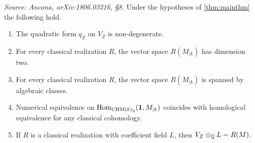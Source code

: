 \begin{proposition}
  \label{prop:mainthm-properties}
  \textit{Source: Ancona, arXiv:1806.03216, §8.}
  Under the hypotheses of \cref{thm:mainthm} the following hold.
  \begin{enumerate}
    \item The quadratic form \(q_Z\) on \(V_Z\) is non-degenerate.
    \item For every classical realization \(R\), the vector space
      \(R(M_{\vert{k}})\) has dimension two.
    \item For every classical realization \(R\), the vector space
      \(R(M_{\vert{k}})\) is spanned by algebraic classes.
    \item Numerical equivalence on \(\mathrm{Hom}_{\mathrm{CHM}(k)_{\mathbb{Q}}}(\mathbf{1}, M_{\vert{k}})\)
      coincides with homological equivalence for any classical cohomology.
    \item If \(R\) is a classical realization with coefficient field \(L\), then
      \(V_Z \otimes_{\mathbb{Q}} L = R(M)\).
  \end{enumerate}
\end{proposition}

